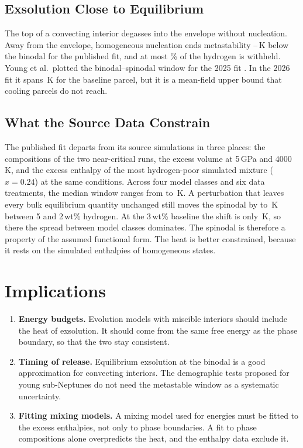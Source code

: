 \subsection{Exsolution Close to Equilibrium}

The top of a convecting interior degasses into the envelope without nucleation. Away from the
envelope, homogeneous nucleation ends metastability \dlyFigOneCPubLo{}--\dlyFigOneCPubHi{}\,K
below the binodal for the published fit, and at most \whFigOneCPubHi{}\% of the hydrogen is
withheld. Young et al.\ plotted the binodal--spinodal window for the 2025 fit
\cite{young2025}. In the 2026 fit it spans \pubIntTwo{}\,K for the baseline parcel, but it is a
mean-field upper bound that cooling parcels do not reach.

\subsection{What the Source Data Constrain}

The published fit departs from its source simulations in three places: the compositions of the
two near-critical runs, the excess volume at 5\,GPa and 4000\,K, and the excess enthalpy of the
most hydrogen-poor simulated mixture ($x = 0.24$) at the same conditions. Across four model
classes and six
data treatments, the median window ranges from \IntRangeLo{} to \IntRangeHi{}\,K. A perturbation
that leaves every bulk equilibrium quantity unchanged still moves the spinodal by
\bumpFiveAbs{} to \bumpTwoAbs{}\,K between 5 and 2\,wt\% hydrogen. At the 3\,wt\% baseline the
shift is only \bumpThree{}\,K, so there the spread between model classes dominates. The spinodal
is therefore a property of the assumed functional form. The heat is better constrained, because
it rests on the simulated enthalpies of homogeneous states.

\section{Implications}

\begin{enumerate}
\item \textbf{Energy budgets.} Evolution models with miscible interiors should include the heat
of exsolution. It should come from the same free energy as the phase boundary, so that the two
stay consistent.
\item \textbf{Timing of release.} Equilibrium exsolution at the binodal is a good approximation
for convecting interiors. The demographic tests proposed for young sub-Neptunes
\cite{rogers2026} do not need the metastable window as a systematic uncertainty.
\item \textbf{Fitting mixing models.} A mixing model used for energies must be fitted to the
excess enthalpies, not only to phase boundaries. A fit to phase compositions alone overpredicts
the heat, and the enthalpy data exclude it.
\end{enumerate}

